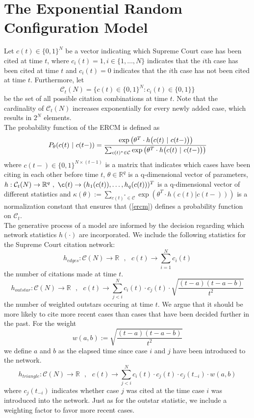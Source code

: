 \documentclass[headsepline=true, abstracton]{scrartcl}
\begin{document}
 \section{The Exponential Random Configuration Model}
Let $c(t)\in \{0,1\}^N$ be a vector indicating which Supreme Court case has been cited at time $t$, where $c_i(t)=1, i \in \{1, \dots , N\}$ indicates that the $i$th case has been cited at time $t$ and $c_i(t)=0$ indicates that the $i$th case has not been cited at time $t$. Furthermore, let
$$\mathcal{C}_t(N)=\{c(t)\in \{0,1\}^N: c_i(t)\in \{0,1\} \}$$ 
be the set of all possible citation combinations at time $t$. Note that the cardinality of $\mathcal{C}_t(N)$ increases exponentially for every newly added case, which results in $2^N$ elements.\\
The probability function of the ERCM is defined as
\begin{equation}
P_{\theta}(c(t)~|~c(t-))=\cfrac{\exp\big(\theta^T\cdot h\big(c(t)~|~c(t-)\big)\big)}{\sum_{c(t)^*\in \mathcal{C}}\exp\big(\theta^T\cdot h\big(c(t)~|~c(t-)\big)\big)}
\label{ercm}
\end{equation}
where $c(t-)\in \{0,1\}^{N \times (t-1)}$ is a matrix that indicates which cases have been citing in each other before time $t$, $\theta \in \mathbb{R}^q$ is a q-dimensional vector of parameters,  $h: \mathcal{C}_t(N) \to \mathbb{R}^q ~, ~ \c(t) \to (h_1(c(t)), \dots , h_q(c(t)))^T$ is a q-dimensional vector of different statistics and $\kappa(\theta) := \sum_{c(t)^*\in \mathcal{C}}\exp(\theta^T\cdot h(c(t)|c(t-)))$ is a normalization constant that ensures that (\ref{ercm}) defines a probability function on $\mathcal{C}_t$.\\[0.3cm]

The generative process of a model are informed by
the decision regarding which network statistics $h(\cdot)$ are incorporated. We include the following statistics for the Supreme Court citation network:
$$h_{edges}:\mathcal{C}(N)\to \mathbb{R}~~~, ~~~c(t) \to \sum_{i=1}^Nc_i(t)$$
the number of citations made at time $t$. 
$$h_{outstar}:\mathcal{C}(N)\to \mathbb{R}~~~, ~~~c(t) \to \sum_{j<i}^Nc_i(t)\cdot c_j(t) \cdot \sqrt{\dfrac{(t-a)(t-a-b)}{t^2}}$$
the number of weighted outstars occuring at time $t$. We argue that it should be more likely to cite more recent cases than cases that have been decided further in the past. For the weight 
$$w(a,b):= \sqrt{\dfrac{(t-a)(t-a-b)}{t^2}}$$
we define $a$ and $b$ as the elapsed time since case $i$ and $j$ have been introduced to the network.
$$h_{triangle}:\mathcal{C}(N)\to \mathbb{R}~~~, ~~~c(t) \to \sum_{j<i}^Nc_i(t)\cdot c_j(t) \cdot
c_j(t_{-i}) \cdot w(a,b)$$
where $c_j(t_{-i})$ indicates whether case $j$ was cited at the time case $i$ was introduced into the network. Just as for the outstar statistic, we include a weighting factor to favor more recent cases. \\[0.3cm]
\end{document}
